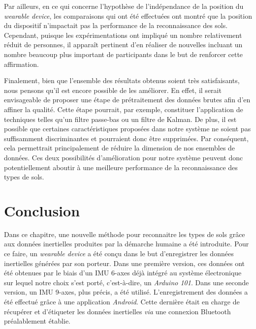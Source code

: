 Par ailleurs, en ce qui concerne l'hypothèse de l'indépendance de la position du \textit{wearable device}, les comparaisons qui ont été effectuées ont montré que la position du dispositif n'impactait pas la performance de la reconnaissance des sols. Cependant, puisque les expérimentations ont impliqué un nombre relativement réduit de personnes, il apparaît pertinent d'en réaliser de nouvelles incluant un nombre beaucoup plus important de participants dans le but de renforcer cette affirmation.

Finalement, bien que l'ensemble des résultats obtenus soient très satisfaisants, nous pensons qu'il est encore possible de les améliorer. En effet, il serait envisageable de proposer une étape de prétraitement des données brutes afin d'en affiner la qualité. Cette étape pourrait, par exemple, constituer l'application de techniques telles qu'un filtre passe-bas ou un filtre de Kalman. De plus, il est possible que certaines caractéristiques proposées dans notre système ne soient pas suffisamment discriminantes et pourraient donc être supprimées. Par conséquent, cela permettrait principalement de réduire la dimension de nos ensembles de données. Ces deux possibilités d'amélioration pour notre système peuvent donc potentiellement aboutir à une meilleure performance de la reconnaissance des types de sols.

\section{Conclusion}

Dans ce chapitre, une nouvelle méthode pour reconnaitre les types de sols grâce aux données inertielles produites par la démarche humaine a été introduite. Pour ce faire, un \textit{wearable device} a été conçu dans le but d'enregistrer les données inertielles générées par son porteur. Dans une première version, ces données ont été obtenues par le biais d'un \acs{IMU} 6-axes déjà intégré au système électronique sur lequel notre choix s'est porté, c'est-à-dire, un \textit{Arduino 101}. Dans une seconde version, un \acs{IMU} 9-axes, plus précis, a été utilisé. L'enregistrement des données a été effectué grâce à une application \textit{Android}. Cette dernière était en charge de récupérer et d'étiqueter les données inertielles \textit{via} une connexion Bluetooth préalablement établie.

